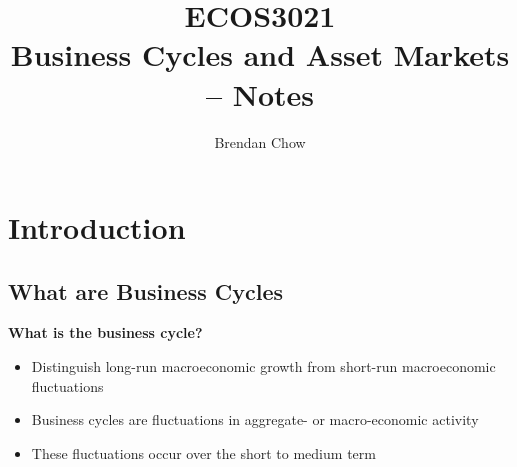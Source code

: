 \documentclass[a4paper]{article}
\begin{document}
\title{{ECOS3021}\\{\normalsize{Business Cycles and Asset Markets -- Notes}}}
	\author{Brendan Chow}
	\maketitle
	\newpage
	\pagestyle{fancynotes}

\section{Introduction}\label{Sec:1}
\subsection{What are Business Cycles}
	\textbf{What is the business cycle?}
	\begin{itemize}
		\item Distinguish \textcolor{myred}{long-run} macroeconomic \textcolor{myred}{growth} from \textcolor{myblue}{short-run} macroeconomic \textcolor{myblue}{fluctuations}
		\item Business cycles are \textcolor{myblue}{fluctuations} in aggregate- or macro-economic activity
		\item These fluctuations occur over the \textcolor{myblue}{short to medium} term
	\end{itemize}
\end{document}
